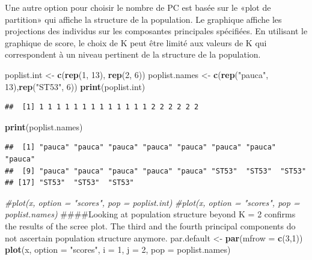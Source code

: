 \documentclass[]{article}
\newenvironment{Shaded}{\begin{snugshade}}{\end{snugshade}}
\newcommand{\KeywordTok}[1]{\textcolor[rgb]{0.13,0.29,0.53}{\textbf{#1}}}
\newcommand{\DataTypeTok}[1]{\textcolor[rgb]{0.13,0.29,0.53}{#1}}
\newcommand{\DecValTok}[1]{\textcolor[rgb]{0.00,0.00,0.81}{#1}}
\newcommand{\StringTok}[1]{\textcolor[rgb]{0.31,0.60,0.02}{#1}}
\newcommand{\CommentTok}[1]{\textcolor[rgb]{0.56,0.35,0.01}{\textit{#1}}}
\newcommand{\NormalTok}[1]{#1}
\begin{document}
Une autre option pour choisir le nombre de PC est basée sur le «plot de
partition» qui affiche la structure de la population. Le graphique
affiche les projections des individus sur les composantes principales
spécifiées. En utilisant le graphique de score, le choix de K peut être
limité aux valeurs de K qui correspondent à un niveau pertinent de la
structure de la population.

\begin{Shaded}
\begin{Highlighting}[]
\NormalTok{poplist.int <-}\StringTok{ }\KeywordTok{c}\NormalTok{(}\KeywordTok{rep}\NormalTok{(}\DecValTok{1}\NormalTok{, }\DecValTok{13}\NormalTok{), }\KeywordTok{rep}\NormalTok{(}\DecValTok{2}\NormalTok{, }\DecValTok{6}\NormalTok{))}
\NormalTok{poplist.names <-}\StringTok{ }\KeywordTok{c}\NormalTok{(}\KeywordTok{rep}\NormalTok{(}\StringTok{"pauca"}\NormalTok{, }\DecValTok{13}\NormalTok{),}\KeywordTok{rep}\NormalTok{(}\StringTok{"ST53"}\NormalTok{, }\DecValTok{6}\NormalTok{))}
\KeywordTok{print}\NormalTok{(poplist.int)}
\end{Highlighting}
\end{Shaded}

\begin{verbatim}
##  [1] 1 1 1 1 1 1 1 1 1 1 1 1 1 2 2 2 2 2 2
\end{verbatim}

\begin{Shaded}
\begin{Highlighting}[]
\KeywordTok{print}\NormalTok{(poplist.names)}
\end{Highlighting}
\end{Shaded}

\begin{verbatim}
##  [1] "pauca" "pauca" "pauca" "pauca" "pauca" "pauca" "pauca" "pauca"
##  [9] "pauca" "pauca" "pauca" "pauca" "pauca" "ST53"  "ST53"  "ST53" 
## [17] "ST53"  "ST53"  "ST53"
\end{verbatim}

\begin{Shaded}
\begin{Highlighting}[]
\CommentTok{#plot(x, option = "scores", pop = poplist.int)}
\CommentTok{#plot(x, option = "scores", pop = poplist.names)}
\NormalTok{####Looking at population structure beyond K = 2 confirms the results of the scree plot. The third and the fourth principal components do not ascertain population structure anymore.}
\NormalTok{par.default <-}\StringTok{ }\KeywordTok{par}\NormalTok{(}\DataTypeTok{mfrow =} \KeywordTok{c}\NormalTok{(}\DecValTok{3}\NormalTok{,}\DecValTok{1}\NormalTok{))}
\KeywordTok{plot}\NormalTok{(x, }\DataTypeTok{option =} \StringTok{"scores"}\NormalTok{, }\DataTypeTok{i =} \DecValTok{1}\NormalTok{, }\DataTypeTok{j =} \DecValTok{2}\NormalTok{, }\DataTypeTok{pop =}\NormalTok{ poplist.names)}
\end{Highlighting}
\end{Shaded}
\end{document}
